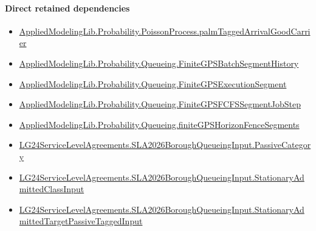 \documentclass[10pt]{article}
\begin{document}
\paragraph{Direct retained dependencies}
\begin{itemize}\raggedright
\item \hyperlink{governing-declaration-ae13476c571ece6d}{Applied\allowbreak{}Modeling\allowbreak{}Lib.\allowbreak{}Probability.\allowbreak{}Poisson\allowbreak{}Process.\allowbreak{}palm\allowbreak{}Tagged\allowbreak{}Arrival\allowbreak{}Good\allowbreak{}Carrier}
\item \hyperlink{governing-declaration-3746e7ce0902fe7e}{Applied\allowbreak{}Modeling\allowbreak{}Lib.\allowbreak{}Probability.\allowbreak{}Queueing.\allowbreak{}Finite\allowbreak{}GPS\allowbreak{}Batch\allowbreak{}Segment\allowbreak{}History}
\item \hyperlink{governing-declaration-5fc1a8f6958b6ad7}{Applied\allowbreak{}Modeling\allowbreak{}Lib.\allowbreak{}Probability.\allowbreak{}Queueing.\allowbreak{}Finite\allowbreak{}GPS\allowbreak{}Execution\allowbreak{}Segment}
\item \hyperlink{governing-declaration-8fcaf575fc5b34e1}{Applied\allowbreak{}Modeling\allowbreak{}Lib.\allowbreak{}Probability.\allowbreak{}Queueing.\allowbreak{}Finite\allowbreak{}GPSFCFS\allowbreak{}Segment\allowbreak{}Job\allowbreak{}Step}
\item \hyperlink{governing-declaration-87da9a7d8ef692ef}{Applied\allowbreak{}Modeling\allowbreak{}Lib.\allowbreak{}Probability.\allowbreak{}Queueing.\allowbreak{}finite\allowbreak{}GPS\allowbreak{}Horizon\allowbreak{}Fence\allowbreak{}Segments}
\item \hyperlink{governing-declaration-abc91e26948cf0a3}{LG24\allowbreak{}Service\allowbreak{}Level\allowbreak{}Agreements.\allowbreak{}SLA2026\allowbreak{}Borough\allowbreak{}Queueing\allowbreak{}Input.\allowbreak{}Passive\allowbreak{}Category}
\item \hyperlink{governing-declaration-f3072ff54a3653c2}{LG24\allowbreak{}Service\allowbreak{}Level\allowbreak{}Agreements.\allowbreak{}SLA2026\allowbreak{}Borough\allowbreak{}Queueing\allowbreak{}Input.\allowbreak{}Stationary\allowbreak{}Admitted\allowbreak{}Class\allowbreak{}Input}
\item \hyperlink{governing-declaration-8796a25a610eaea9}{LG24\allowbreak{}Service\allowbreak{}Level\allowbreak{}Agreements.\allowbreak{}SLA2026\allowbreak{}Borough\allowbreak{}Queueing\allowbreak{}Input.\allowbreak{}Stationary\allowbreak{}Admitted\allowbreak{}Target\allowbreak{}Passive\allowbreak{}Tagged\allowbreak{}Input}

\end{itemize}
\end{document}
